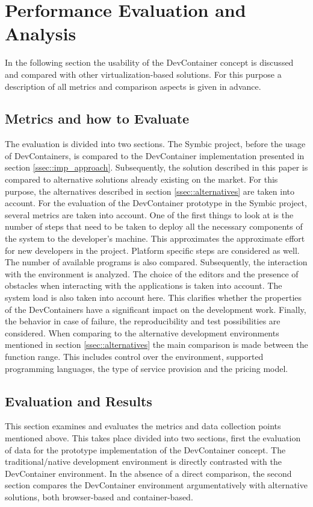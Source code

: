 
\section{Performance Evaluation and Analysis}\label{sec::eval}
In the following section the usability of the DevContainer concept is discussed and compared with other virtualization-based solutions. For this purpose a description of all metrics and comparison aspects is given in advance.

\subsection{Metrics and how to Evaluate}
The evaluation is divided into two sections. The Symbic project, before the usage of DevContainers, is compared to the DevContainer implementation presented in section \ref{ssec::imp_approach}. Subsequently, the solution described in this paper is compared to alternative solutions already existing on the market. For this purpose, the alternatives described in section \ref{ssec::alternatives} are taken into account.\newline
For the evaluation of the DevContainer prototype in the Symbic project, several metrics are taken into account. One of the first things to look at is the number of steps that need to be taken to deploy all the necessary components of the system to the developer's machine. This approximates the approximate effort for new developers in the project. Platform specific steps are considered as well. The number of available programs is also compared. Subsequently, the interaction with the environment is analyzed. The choice of the editors and the presence of obstacles when interacting with the applications is taken into account. The system load is also taken into account here. This clarifies whether the properties of the DevContainers have a significant impact on the development work. Finally, the behavior in case of failure, the reproducibility and test possibilities are considered. \newline
When comparing to the alternative development environments mentioned in section \ref{ssec::alternatives} the main comparison is made between the function range. This includes control over the environment, supported programming languages, the type of service provision and the pricing model.

\subsection{Evaluation and Results}\label{sses::eval_compare}
This section examines and evaluates the metrics and data collection points mentioned above. This takes place divided into two sections, first the evaluation of data for the prototype implementation of the DevContainer concept. The traditional/native development environment is directly contrasted with the DevContainer environment.
In the absence of a direct comparison, the second section compares the DevContainer environment argumentatively with alternative solutions, both browser-based and container-based.

